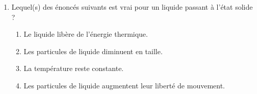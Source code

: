 \documentclass[
  11pt,
  a4paper,
  openany]{book}
\providecommand{\tightlist}{%
  \setlength{\itemsep}{0pt}\setlength{\parskip}{0pt}}
\begin{document}
\begin{Exercise}
\begin{enumerate}
  \begin{enumerate}
  \def\labelenumii{\alph{enumii}.}
  \tightlist
  \item
    La température du liquide reste constante.
  \item
    Les particules de liquide gagnent en liberté de mouvement.
  \item
    Les particules de liquide augmentent en taille.
  \item
    Le liquide libère de l'énergie thermique.
  \end{enumerate}
\item
  Lequel(s) des énoncés suivants est vrai pour un liquide passant à l'état solide ?

  \begin{enumerate}
  \def\labelenumii{\alph{enumii}.}
  \tightlist
  \item
    Le liquide libère de l'énergie thermique.
  \item
    Les particules de liquide diminuent en taille.
  \item
    La température reste constante.
  \item
    Les particules de liquide augmentent leur liberté de mouvement.
  \end{enumerate}
\end{enumerate}

\end{Exercise}
\end{document}
